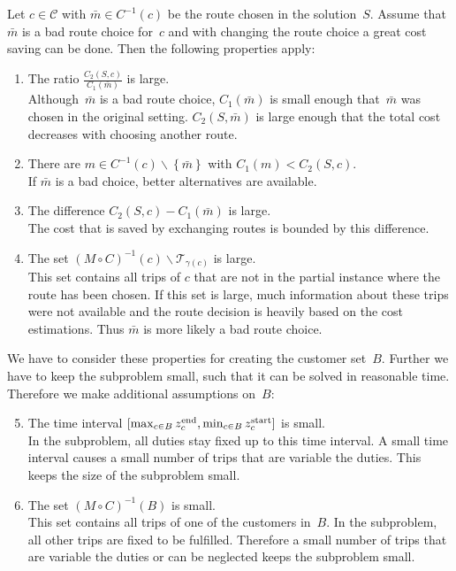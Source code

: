 Let ${c\in\mathcal{C}}$ with ${\bar{m}\in C^{-1}(c)}$ be the route chosen in the solution~$S$. Assume that~$\bar{m}$ is a bad route choice for~$c$ and with changing the route choice a great cost saving can be done. Then the following properties apply:
\begin{enumerate}
	\item The ratio $\frac{C_2(S,c)}{C_1\left(\bar{m}\right)}$ is large. \\
	Although~$\bar{m}$ is a bad route choice, $C_1\left(\bar{m}\right)$ is small enough that~$\bar{m}$ was chosen in the original setting. $C_2\left(S,\bar{m}\right)$ is large enough that the total cost decreases with choosing another route.
	\item There are ${m\in C^{-1}(c)\backslash\left\{\bar{m}\right\}}$ with ${C_1(m)<C_2(S,c)}$. \\
	If $\bar{m}$ is a bad choice, better alternatives are available.
	\item The difference ${C_2(S,c) - C_1\left(\bar{m}\right)}$ is large. \\
	The cost that is saved by exchanging routes is bounded by this difference.
	\item The set ${(M\circ C)^{-1}(c)\backslash\mathcal{T}_{\gamma(c)}}$ is large. \\
	This set contains all trips of $c$ that are not in the partial instance where the route has been chosen. If this set is large, much information about these trips were not available and the route decision is heavily based on the cost estimations. Thus $\bar{m}$ is more likely a bad route choice.
\end{enumerate}

We have to consider these properties for creating the customer set~$B$. Further we have to keep the subproblem small, such that it can be solved in reasonable time. Therefore we make additional assumptions on~$B$:
\begin{enumerate}
\setcounter{enumi}{4}
	\item The time interval ${[\max_{c\in B}z^{\operatorname{end}}_c, \min_{c\in B}z^{\operatorname{start}}_c]}$ is small. \\
	In the subproblem, all duties stay fixed up to this time interval. A small time interval causes a small number of trips that are variable \wrt the duties. This keeps the size of the subproblem small.
	\item The set ${(M\circ C)^{-1}(B)}$ is small. \\
	This set contains all trips of one of the customers in~$B$. In the subproblem, all other trips are fixed to be fulfilled. Therefore a small number of trips that are variable \wrt the duties or can be neglected keeps the subproblem small.
\end{enumerate}

